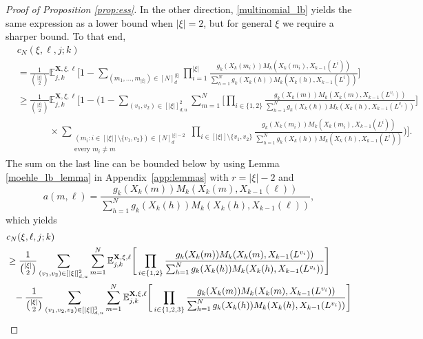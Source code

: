 \documentclass[a4paper,11pt]{article}
\theoremstyle{definition}
\newcommand{\bbE}{\mathbb{E}}
\newcommand{\bfX}{\mathbf{X}}
\begin{document}
\begin{proof}[Proof of Proposition \ref{prop:ess}]
In the other direction, \eqref{multinomial_lb} yields the same expression as a lower bound when $| \xi | = 2$, but for general $\xi$ we require a sharper bound.
To that end,
\begin{align*}
& c_N( \xi, \ell, j; k ) \\
&= \frac{ 1 }{ \binom{ | \xi | }{ 2 } } \bbE_{ j, k }^{ \bfX, \xi, \ell }\Bigg[ 1 -  \sum_{ ( m_1, \ldots, m_{ | \xi | } ) \in [ N ]_d^{ | \xi | } } \prod_{ i = 1 }^{ | \xi | } \frac{ g_k( X_k( m_i ) ) M_k( X_k( m_i ), X_{ k - 1 }( L^i ) ) }{ \sum_{ h = 1 }^N g_k( X_k( h ) ) M_k( X_k( h ), X_{ k - 1 }( L^i ) ) } \Bigg] \\
&\geq \frac{ 1 }{ \binom{ | \xi | }{ 2 } } \bbE_{ j, k }^{ \bfX, \xi, \ell }\Bigg[ 1  - \Bigg( 1 - \sum_{ ( v_1, v_2 ) \in [ | \xi | ]_{ d, u }^2 } \sum_{ m = 1 }^N \Bigg[\prod_{ i \in \{ 1, 2 \} } \frac{ g_k( X_k( m ) ) M_k( X_k( m ), X_{ k - 1 }( L^{ v_i } ) ) }{ \sum_{ h = 1 }^N g_k( X_k( h ) ) M_k( X_k( h ), X_{ k - 1 }( L^{ v_i } ) ) } \Bigg] \\
&\phantom{\geq  \frac{ 1 }{ \binom{ | \xi | }{ 2 } } } \times \sum_{ \substack{ ( m_i : i \in [ | \xi | ] \setminus \{ v_1, v_2 \} ) \in [ N ]_d^{ | \xi | - 2 } \\ \text{every } m_i \neq m } } \prod_{ i \in [ | \xi | ] \setminus \{ v_1, v_2 \} } \frac{ g_k( X_k( m_i ) ) M_k( X_k( m_i ), X_{ k - 1 }( L^i ) ) }{ \sum_{ h = 1 }^N g_k( X_k( h ) ) M_k( X_k( h ), X_{ k - 1 }( L^i ) ) } \Bigg) \Bigg].
\end{align*}
The sum on the last line can be bounded below by using Lemma \ref{moehle_lb_lemma} in Appendix~\ref{app:lemmas} with $r = | \xi | - 2$ and 
\begin{equation*}
a( m, \ell ) = \frac{ g_k( X_k( m ) ) M_k( X_k( m ), X_{ k - 1 }( \ell ) ) }{ \sum_{ h = 1 }^N g_k( X_k( h ) ) M_k( X_k( h ), X_{ k - 1 }( \ell ) ) },
\end{equation*}
which yields
\begin{align}
&c_N( \xi, \ell, j; k ) \label{prop3.2_lb} \\
&\geq \frac{ 1 }{ \binom{ | \xi | }{ 2 } } \sum_{ ( v_1, v_2 ) \in [ | \xi | ]_{ d, u }^2 } \sum_{ m = 1 }^N \bbE_{ j, k }^{ \bfX, \xi, \ell }\Bigg[\prod_{ i \in \{ 1, 2 \} } \frac{ g_k( X_k( m ) ) M_k( X_k( m ), X_{ k - 1 }( L^{ v_i } ) ) }{ \sum_{ h = 1 }^N g_k( X_k( h ) ) M_k( X_k( h ), X_{ k - 1 }( L^{ v_i } ) ) } \Bigg] \notag \\
&\phantom{\geq}- \frac{ 1 }{ \binom{ | \xi | }{ 2 } } \sum_{ ( v_1, v_2, v_3 ) \in [ | \xi | ]_{ d, u }^3 } \sum_{ m = 1 }^N \bbE_{ j, k }^{ \bfX, \xi, \ell }\Bigg[\prod_{ i \in \{ 1, 2, 3 \} } \frac{ g_k( X_k( m ) ) M_k( X_k( m ), X_{ k - 1 }( L^{ v_i } ) ) }{ \sum_{ h = 1 }^N g_k( X_k( h ) ) M_k( X_k( h ), X_{ k - 1 }( L^{ v_i } ) ) } \Bigg] \notag \\

\end{align}
\end{proof}
\end{document}
